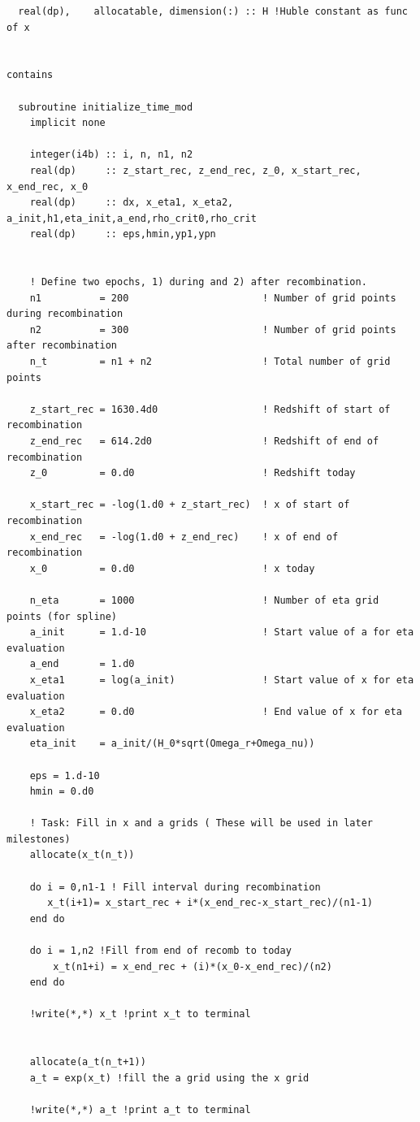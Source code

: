 \documentclass{aa}   %
\begin{document}
\begin{verbatim}
  real(dp),    allocatable, dimension(:) :: H !Huble constant as func of x


contains

  subroutine initialize_time_mod
    implicit none

    integer(i4b) :: i, n, n1, n2
    real(dp)     :: z_start_rec, z_end_rec, z_0, x_start_rec, x_end_rec, x_0
    real(dp)     :: dx, x_eta1, x_eta2, a_init,h1,eta_init,a_end,rho_crit0,rho_crit
    real(dp)     :: eps,hmin,yp1,ypn


    ! Define two epochs, 1) during and 2) after recombination.
    n1          = 200                       ! Number of grid points during recombination
    n2          = 300                       ! Number of grid points after recombination
    n_t         = n1 + n2                   ! Total number of grid points

    z_start_rec = 1630.4d0                  ! Redshift of start of recombination
    z_end_rec   = 614.2d0                   ! Redshift of end of recombination
    z_0         = 0.d0                      ! Redshift today

    x_start_rec = -log(1.d0 + z_start_rec)  ! x of start of recombination
    x_end_rec   = -log(1.d0 + z_end_rec)    ! x of end of recombination
    x_0         = 0.d0                      ! x today
    
    n_eta       = 1000                      ! Number of eta grid points (for spline)
    a_init      = 1.d-10                    ! Start value of a for eta evaluation
    a_end       = 1.d0
    x_eta1      = log(a_init)               ! Start value of x for eta evaluation
    x_eta2      = 0.d0                      ! End value of x for eta evaluation
    eta_init    = a_init/(H_0*sqrt(Omega_r+Omega_nu))

    eps = 1.d-10
    hmin = 0.d0

    ! Task: Fill in x and a grids ( These will be used in later milestones)
    allocate(x_t(n_t))

    do i = 0,n1-1 ! Fill interval during recombination
       x_t(i+1)= x_start_rec + i*(x_end_rec-x_start_rec)/(n1-1)
    end do

    do i = 1,n2 !Fill from end of recomb to today
        x_t(n1+i) = x_end_rec + (i)*(x_0-x_end_rec)/(n2)
    end do

    !write(*,*) x_t !print x_t to terminal


    allocate(a_t(n_t+1))
    a_t = exp(x_t) !fill the a grid using the x grid

    !write(*,*) a_t !print a_t to terminal



\end{verbatim}
\end{document}
